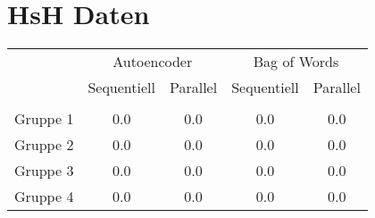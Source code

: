 \section{HsH Daten}

\begin{center}
    \begin{tabular}{l c c c c}
     		 & \multicolumn{2}{c}{Autoencoder} & \multicolumn{2}{c}{Bag of Words}  \\
    	     & Sequentiell & Parallel 	& Sequentiell  & Parallel  		\\ \hline
    	     															\\[-0.9em] 
    Gruppe 1 & 0.0		   & 0.0		& 0.0		   & 0.0			\\     
    Gruppe 2 & 0.0		   & 0.0		& 0.0		   & 0.0			\\ 
    Gruppe 3 & 0.0		   & 0.0	 	& 0.0		   & 0.0			\\ 
    Gruppe 4 & 0.0		   & 0.0		& 0.0		   & 0.0			\\
    \end{tabular}
\end{center}
